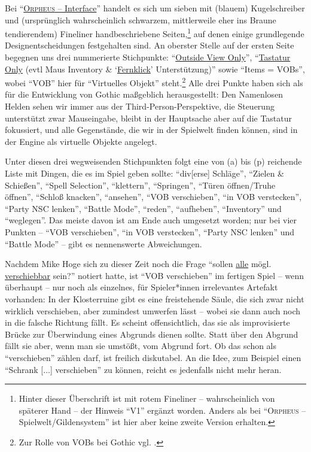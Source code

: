 \documentclass[a5paper,pagesize]{scrbook}
\begin{document}
Bei \enquote{\uline{\textsc{Orpheus} -- Interface}} handelt es sich um sieben mit (blauem) Kugelschreiber und (ursprünglich wahrscheinlich schwarzem, mittlerweile eher ins Braune tendierendem) Fineliner handbeschriebene Seiten,\footnote{Hinter dieser Überschrift ist mit rotem Fineliner -- wahrscheinlich von späterer Hand -- der Hinweis \enquote{V1} ergänzt worden. Anders als bei \enquote{\textsc{Orpheus} -- Spielwelt/Gildensystem} ist hier aber keine zweite Version erhalten.} auf denen einige grundlegende Designentscheidungen festgehalten sind.
An oberster Stelle auf der ersten Seite begegnen uns drei nummerierte Stichpunkte:
\enquote{\uline{Outside View Only}}, \enquote{\uline{Tastatur Only} (evtl Maus Inventory \& \enquote{\uline{Fernklick}} Unterstützung)} sowie \enquote{Items = VOBs},\autocite[S.~1]{orpheus_interface} wobei \enquote{VOB} hier für \enquote{Virtuelles Objekt} steht.\footnote{Zur Rolle von VOBs bei Gothic vgl. \autocite{wiki_vob}.}
Alle drei Punkte haben sich als für die Entwicklung von Gothic maßgeblich herausgestellt:
Den Namenlosen Helden sehen wir immer aus der Third-Person-Perspektive, die Steuerung unterstützt zwar Mauseingabe, bleibt in der Hauptsache aber auf die Tastatur fokussiert, und alle Gegenstände, die wir in der Spielwelt finden können, sind in der Engine als virtuelle Objekte angelegt.

Unter diesen drei wegweisenden Stichpunkten folgt eine von (a) bis (p) reichende Liste mit Dingen, die es im Spiel geben sollte:
\enquote{div[erse] Schläge}, \enquote{Zielen \& Schießen}, \enquote{Spell Selection}, \enquote{klettern}, \enquote{Springen}, \enquote{Türen öffnen/Truhe öffnen}, \enquote{Schloß knacken}, \enquote{ansehen}, \enquote{VOB verschieben}, \enquote{in VOB verstecken}, \enquote{Party NSC lenken}, \enquote{Battle Mode}, \enquote{reden}, \enquote{aufheben}, \enquote{Inventory} und \enquote{weglegen}.\autocite[S.~1]{orpheus_interface}
Das meiste davon ist am Ende auch umgesetzt worden; nur bei vier Punkten -- \enquote{VOB verschieben}, \enquote{in VOB verstecken}, \enquote{Party NSC lenken} und \enquote{Battle Mode} -- gibt es nennenswerte Abweichungen.

Nachdem Mike Hoge sich zu dieser Zeit noch die Frage \enquote{sollen \uline{alle} mögl. \uline{verschiebbar} sein?}\autocite[S.~3]{orpheus_interface} notiert hatte, ist \enquote{VOB verschieben} im fertigen Spiel -- wenn überhaupt -- nur noch als einzelnes, für Spieler*innen irrelevantes Artefakt vorhanden:
In der Klosterruine gibt es eine freistehende Säule, die sich zwar nicht wirklich verschieben, aber zumindest umwerfen lässt -- wobei sie dann auch noch in die falsche Richtung fällt.
Es scheint offensichtlich, das sie als improvisierte Brücke zur Überwindung eines Abgrunds dienen sollte.
Statt über den Abgrund fällt sie aber, wenn man sie umstößt, vom Abgrund fort.
Ob das schon als \enquote{verschieben} zählen darf, ist freilich diskutabel.
An die Idee, zum Beispiel einen \enquote{Schrank [$\ldots$] verschieben}\autocite[S.~3]{orpheus_interface} zu können, reicht es jedenfalls nicht mehr heran.
\end{document}
